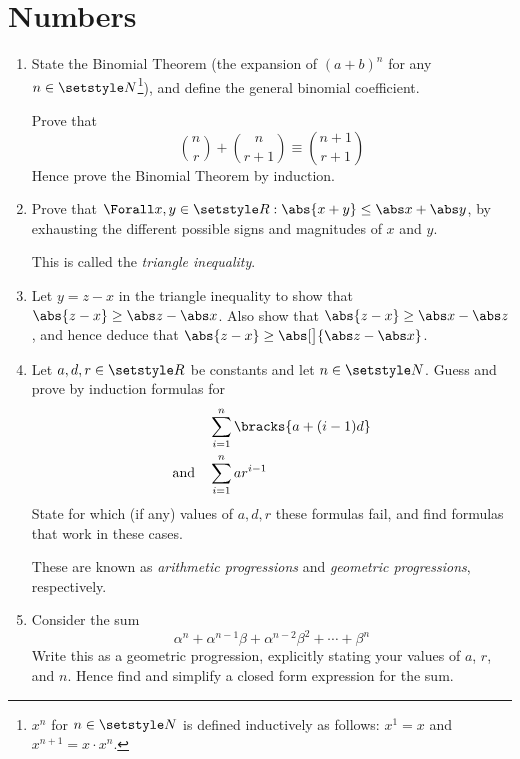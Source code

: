 \section{Numbers}

\begin{enumerate}
 \item
  State the Binomial Theorem
  (the expansion of \((a + b)^n\) for any \(n \in \Naturals\)\footnote{
   \(x^n\) for \(n \in \Naturals\) is defined inductively as follows:
   \(x^1 = x\) and \(x^{n + 1} = x \cdot x^n\).
  }), and define the
  general binomial coefficient.

  Prove that
  \begin{equation*}
   \binom nr + \binom n{r + 1} \equiv \binom{n + 1}{r + 1}
  \end{equation*}
  Hence prove the Binomial Theorem by induction.
 \item
  Prove that \(\Forall x, y \in \Reals : \abs{x + y} \le \abs x + \abs y\), by
  exhausting the different possible signs and magnitudes of \(x\) and \(y\).

  This is called the \emph{triangle inequality}.
 \item
  Let \(y = z - x\) in the triangle inequality to show that
  \(\abs{z - x} \ge \abs z - \abs x\). Also show that
  \(\abs{z - x} \ge \abs x - \abs z\), and hence deduce that
  \(\abs{z - x} \ge \abs[\big]{\abs z - \abs x}\).
 \item
  Let \(a, d, r \in \Reals\) be constants and let \(n \in \Naturals\).
  Guess and prove by induction formulas for
  \begin{align*}
   &\sum_{i = 1}^n \bracks{a + (i - 1)d} \\
   \text{and}\quad&\sum_{i = 1}^n ar^{i - 1}
  \end{align*}
  State for which (if any) values of \(a, d, r\) these formulas fail, and find
  formulas that work in these cases.

  These are known as \emph{arithmetic progressions} and
  \emph{geometric progressions}, respectively.
 \item
  Consider the sum
  \begin{equation*}
   \alpha^n + \alpha^{n - 1}\beta + \alpha^{n - 2}\beta^2 + \dotsb + \beta^n
  \end{equation*}
  Write this as a geometric progression, explicitly stating your values of
  \(a\), \(r\), and \(n\). Hence find and simplify a closed form expression for
  the sum.


\end{enumerate}
